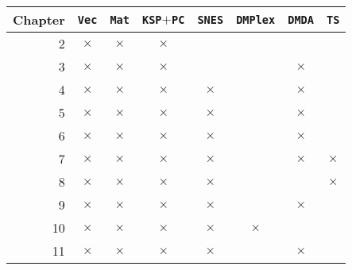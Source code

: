 \documentclass{tufte-book}
\theoremstyle{definition}
\newcommand{\XX}{$\bm{\times}$}  %
\newcommand{\gX}{{\color{Gray} $\times$}}
\newcommand{\pDMDA}{\texttt{DMDA}\xspace}
\newcommand{\pDMPlex}{\texttt{DMPlex}\xspace}
\newcommand{\pPC}{\texttt{PC}\xspace}
\newcommand{\pSNES}{\texttt{SNES}\xspace}
\newcommand{\pTS}{\texttt{TS}\xspace}
\newcommand{\pMat}{\texttt{Mat}\xspace}
\newcommand{\pVec}{\texttt{Vec}\xspace}
\begin{document}
\begin{center}
\begin{tabular}{rccccccc}
\toprule
Chapter 
    &\;\pVec\;
          &\;\pMat\;
                &\;\texttt{KSP}${+}$\pPC\;
                      &\pSNES
                            &\pDMPlex
                                  &\pDMDA
                                        &\;\pTS\; \\
\midrule
2   & \XX & \XX & \XX &     &     &     &      \\
3   & \XX & \XX & \XX &     &     & \XX &      \\
4   & \gX & \XX & \gX & \XX &     & \XX &      \\
5   & \gX & \gX & \gX & \XX &     & \XX &      \\
6   & \gX & \gX & \XX & \XX &     & \XX &      \\
7   & \gX & \gX & \XX & \XX &     & \XX & \XX  \\
8   & \XX & \XX & \gX & \XX &     &     & \XX  \\
9   & \gX & \gX & \XX & \XX &     & \XX &      \\
10  & \gX & \gX & \XX & \XX & \XX &     &      \\
11  & \gX & \gX & \gX & \XX &     & \XX &      \\
\bottomrule
\end{tabular}
\end{center}
\vfill
\end{document}
